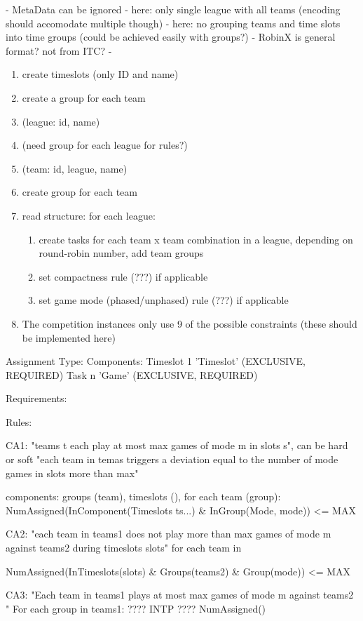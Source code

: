 - MetaData can be ignored
- here: only single league with all teams (encoding should accomodate multiple though)
- here: no grouping teams and time slots into time groups (could be achieved easily with groups?)
- RobinX is general format? not from ITC?
- 

\begin{enumerate}
\item create timeslots (only ID and name)
\item create a group for each team
\item (league: id, name)
\item (need group for each league for rules?)
\item (team: id, league, name)
\item create group for each team
\item read structure: for each league:
\begin{enumerate}
\item create tasks for each team x team combination in a league, depending on round-robin number, add team groups
\item set compactness rule (???) if applicable
\item set game mode (phased/unphased) rule (???) if applicable
\end{enumerate}
\item The competition instances only use 9 of the possible constraints (these should be implemented here)
\end{enumerate}


Assignment Type:
Components:
Timeslot 1 'Timeslot' (EXCLUSIVE, REQUIRED)
Task n 'Game' (EXCLUSIVE, REQUIRED)

Requirements:


Rules:

CA1: "teams t each play at most max games of mode m in slots s", can be hard or soft
"each team in temas triggers a deviation equal to the number of mode games in slots more than max"

components: groups (team), timeslots (),
for each team (group):
NumAssigned(InComponent(Timeslots ts...) & InGroup(Mode, mode)) <= MAX

CA2: "each team in teams1 does not play more than max games of mode m against teams2 during timeslots slots"
for each team in 

NumAssigned(InTimeslots(slots) & Groups(teams2) & Group(mode)) <= MAX

CA3: "Each team in teams1 plays at most max games of mode m against teams2 "
For each group in teams1:
???? INTP ????
NumAssigned()


